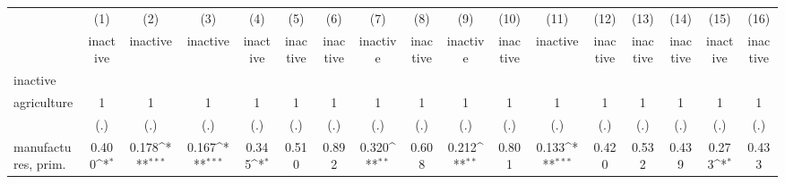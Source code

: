 {
\def\sym#1{\ifmmode^{#1}\else\(^{#1}\)\fi}
\begin{tabular}{l*{16}{c}}
\hline\hline
                    &\multicolumn{1}{c}{(1)}&\multicolumn{1}{c}{(2)}&\multicolumn{1}{c}{(3)}&\multicolumn{1}{c}{(4)}&\multicolumn{1}{c}{(5)}&\multicolumn{1}{c}{(6)}&\multicolumn{1}{c}{(7)}&\multicolumn{1}{c}{(8)}&\multicolumn{1}{c}{(9)}&\multicolumn{1}{c}{(10)}&\multicolumn{1}{c}{(11)}&\multicolumn{1}{c}{(12)}&\multicolumn{1}{c}{(13)}&\multicolumn{1}{c}{(14)}&\multicolumn{1}{c}{(15)}&\multicolumn{1}{c}{(16)}\\
                    &\multicolumn{1}{c}{inactive}&\multicolumn{1}{c}{inactive}&\multicolumn{1}{c}{inactive}&\multicolumn{1}{c}{inactive}&\multicolumn{1}{c}{inactive}&\multicolumn{1}{c}{inactive}&\multicolumn{1}{c}{inactive}&\multicolumn{1}{c}{inactive}&\multicolumn{1}{c}{inactive}&\multicolumn{1}{c}{inactive}&\multicolumn{1}{c}{inactive}&\multicolumn{1}{c}{inactive}&\multicolumn{1}{c}{inactive}&\multicolumn{1}{c}{inactive}&\multicolumn{1}{c}{inactive}&\multicolumn{1}{c}{inactive}\\
\hline
inactive            &                     &                     &                     &                     &                     &                     &                     &                     &                     &                     &                     &                     &                     &                     &                     &                     \\
agriculture         &           1         &           1         &           1         &           1         &           1         &           1         &           1         &           1         &           1         &           1         &           1         &           1         &           1         &           1         &           1         &           1         \\
                    &         (.)         &         (.)         &         (.)         &         (.)         &         (.)         &         (.)         &         (.)         &         (.)         &         (.)         &         (.)         &         (.)         &         (.)         &         (.)         &         (.)         &         (.)         &         (.)         \\
[1em]
manufactures, prim. &       0.400\sym{*}  &       0.178\sym{***}&       0.167\sym{***}&       0.345\sym{*}  &       0.510         &       0.892         &       0.320\sym{**} &       0.608         &       0.212\sym{**} &       0.801         &       0.133\sym{***}&       0.420         &       0.532         &       0.439         &       0.273\sym{*}  &       0.433         \\

\end{tabular}}
